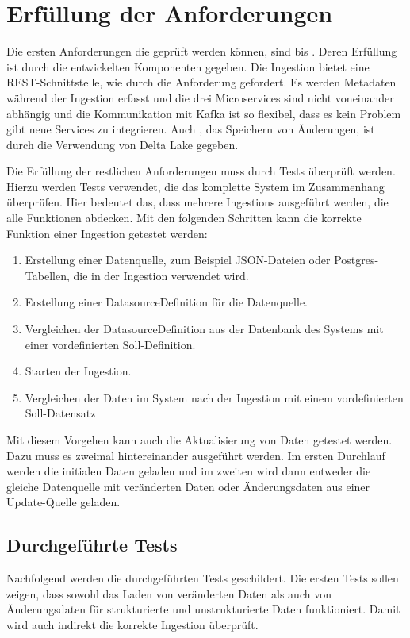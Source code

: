 \section{Erfüllung der Anforderungen}

Die ersten Anforderungen die geprüft werden können, sind  bis .
Deren Erfüllung ist durch die entwickelten Komponenten gegeben.
Die Ingestion bietet eine REST-Schnittstelle, wie durch die Anforderung gefordert.
Es werden Metadaten während der Ingestion erfasst und die drei Microservices sind nicht voneinander abhängig und die Kommunikation mit Kafka ist so flexibel, dass es kein Problem gibt neue Services zu integrieren.
Auch , das Speichern von Änderungen, ist durch die Verwendung von Delta Lake gegeben.

Die Erfüllung der restlichen Anforderungen muss durch Tests überprüft werden.
Hierzu werden Tests verwendet, die das komplette System im Zusammenhang überprüfen.
Hier bedeutet das, dass mehrere Ingestions ausgeführt werden, die alle Funktionen abdecken.
Mit den folgenden Schritten kann die korrekte Funktion einer Ingestion getestet werden: \begin{enumerate}
    \item Erstellung einer Datenquelle, zum Beispiel JSON-Dateien oder Postgres-Ta\-bellen, die in der Ingestion verwendet wird.
    \item Erstellung einer DatasourceDefinition für die Datenquelle.
    \item Vergleichen der DatasourceDefinition aus der Datenbank des Systems mit einer vordefinierten Soll-Definition.
    \item Starten der Ingestion.
    \item Vergleichen der Daten im System nach der Ingestion mit einem vordefinierten Soll-Datensatz
\end{enumerate}
Mit diesem Vorgehen kann auch die Aktualisierung von Daten getestet werden.
Dazu muss es zweimal hintereinander ausgeführt werden.
Im ersten Durchlauf werden die initialen Daten geladen und im zweiten wird dann entweder die gleiche Datenquelle mit veränderten Daten oder Änderungsdaten aus einer Update-Quelle geladen.

\subsection{Durchgeführte Tests}
\label{sec:tests-actual}
Nachfolgend werden die durchgeführten Tests geschildert.
Die ersten Tests sollen zeigen, dass sowohl das Laden von veränderten Daten als auch von Änderungsdaten für strukturierte und unstrukturierte Daten funktioniert.
Damit wird auch indirekt die korrekte Ingestion überprüft.

